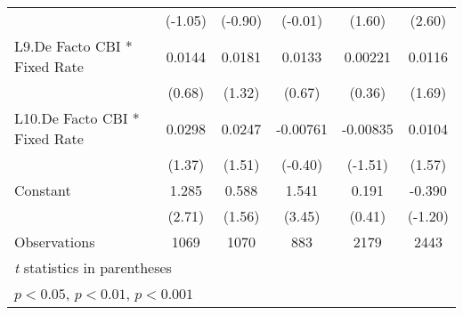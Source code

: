 {\begin{longtable}{l*{5}{c}}
                &  (-1.05)         &  (-0.90)         &  (-0.01)         &   (1.60)         &   (2.60)         \\
[1em]
L9.De Facto CBI * Fixed Rate&   0.0144         &   0.0181         &   0.0133         &  0.00221         &   0.0116         \\
                &   (0.68)         &   (1.32)         &   (0.67)         &   (0.36)         &   (1.69)         \\
[1em]
L10.De Facto CBI * Fixed Rate&   0.0298         &   0.0247         & -0.00761         & -0.00835         &   0.0104         \\
                &   (1.37)         &   (1.51)         &  (-0.40)         &  (-1.51)         &   (1.57)         \\
[1em]
Constant        &    1.285\sym{**} &    0.588         &    1.541\sym{***}&    0.191         &   -0.390         \\
                &   (2.71)         &   (1.56)         &   (3.45)         &   (0.41)         &  (-1.20)         \\
\hline
Observations    &     1069         &     1070         &      883         &     2179         &     2443         \\
\hline\hline
\multicolumn{6}{l}{\footnotesize \textit{t} statistics in parentheses}\\
\multicolumn{6}{l}{\footnotesize \sym{*} \(p<0.05\), \sym{**} \(p<0.01\), \sym{***} \(p<0.001\)}\\
\end{longtable}
}
